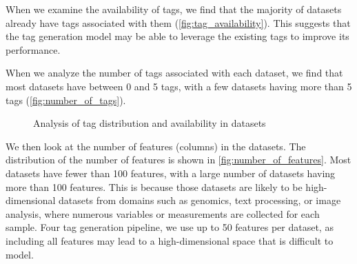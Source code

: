When we examine the availability of tags, we find that the majority of datasets already have tags associated with them (\cref{fig:tag_availability}). This suggests that the tag generation model may be able to leverage the existing tags to improve its performance.

When we analyze the number of tags associated with each dataset, we find that most datasets have between 0 and 5 tags, with a few datasets having more than 5 tags (\cref{fig:number_of_tags}).

\begin{figure}[h]
    \centering
    \hfill
    \caption{Analysis of tag distribution and availability in datasets}
    \label{fig:tag_analysis}
\end{figure}

We then look at the number of features (columns) in the datasets. The distribution of the number of features is shown in \cref{fig:number_of_features}. Most datasets have fewer than 100 features, with a large number of datasets having more than 100 features. This is because those datasets are likely to be high-dimensional datasets from domains such as genomics, text processing, or image analysis, where numerous variables or measurements are collected for each sample. Four tag generation pipeline, we use up to 50 features per dataset, as including all features may lead to a high-dimensional space that is difficult to model.

